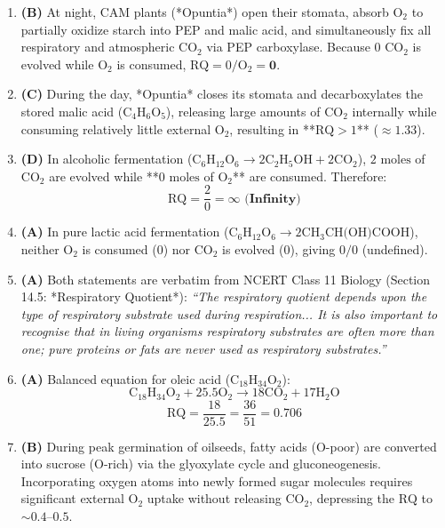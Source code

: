 \documentclass[11pt, a4paper]{article}
\begin{document}
\begin{enumerate}[label=\textbf{\arabic*.}]
\item \textbf{(B)} At night, CAM plants (*Opuntia*) open their stomata, absorb $\text{O}_2$ to partially oxidize starch into PEP and malic acid, and simultaneously fix all respiratory and atmospheric $\text{CO}_2$ via PEP carboxylase. Because $0\text{ CO}_2$ is evolved while $\text{O}_2$ is consumed, $\text{RQ} = 0 / \text{O}_2 = \mathbf{0}$.

\item \textbf{(C)} During the day, *Opuntia* closes its stomata and decarboxylates the stored malic acid ($\text{C}_4\text{H}_6\text{O}_5$), releasing large amounts of $\text{CO}_2$ internally while consuming relatively little external $\text{O}_2$, resulting in **$\text{RQ} > 1$** ($\approx 1.33$).

\item \textbf{(D)} In alcoholic fermentation ($\text{C}_6\text{H}_{12}\text{O}_6 \rightarrow 2\text{C}_2\text{H}_5\text{OH} + 2\text{CO}_2$), $2\text{ moles}$ of $\text{CO}_2$ are evolved while **$0\text{ moles}$ of $\text{O}_2$** are consumed. Therefore:
$$\text{RQ} = \frac{2}{0} = \mathbf{\infty \text{ (Infinity)}}$$

\item \textbf{(A)} In pure lactic acid fermentation ($\text{C}_6\text{H}_{12}\text{O}_6 \rightarrow 2\text{CH}_3\text{CH(OH)COOH}$), neither $\text{O}_2$ is consumed ($0$) nor $\text{CO}_2$ is evolved ($0$), giving $0/0$ (undefined).

\item \textbf{(A)} Both statements are verbatim from NCERT Class 11 Biology (Section 14.5: *Respiratory Quotient*): \textit{``The respiratory quotient depends upon the type of respiratory substrate used during respiration... It is also important to recognise that in living organisms respiratory substrates are often more than one; pure proteins or fats are never used as respiratory substrates.''}

\item \textbf{(A)} Balanced equation for oleic acid ($\text{C}_{18}\text{H}_{34}\text{O}_2$):
$$\text{C}_{18}\text{H}_{34}\text{O}_2 + 25.5\text{O}_2 \longrightarrow 18\text{CO}_2 + 17\text{H}_2\text{O}$$
$$\text{RQ} = \frac{18}{25.5} = \frac{36}{51} = \mathbf{0.706}$$

\item \textbf{(B)} During peak germination of oilseeds, fatty acids ($\text{O}$-poor) are converted into sucrose ($\text{O}$-rich) via the glyoxylate cycle and gluconeogenesis. Incorporating oxygen atoms into newly formed sugar molecules requires significant external $\text{O}_2$ uptake without releasing $\text{CO}_2$, depressing the $\text{RQ}$ to $\sim 0.4\text{--}0.5$.


\end{enumerate}
\end{document}

